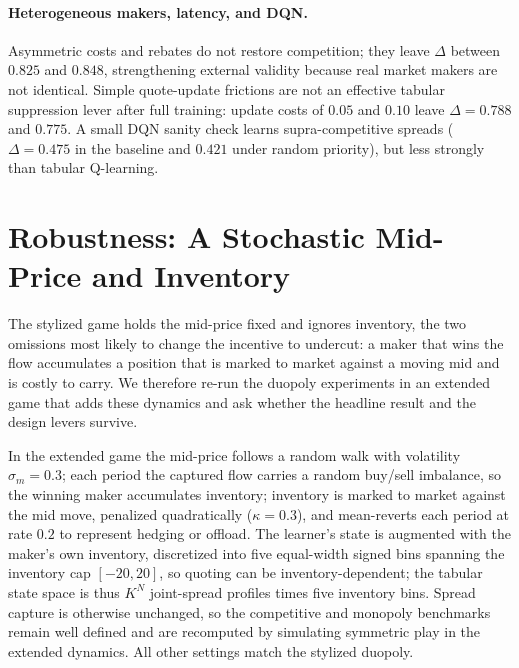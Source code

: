 \documentclass[sigconf]{acmart}
\begin{document}
\paragraph{Heterogeneous makers, latency, and DQN.} Asymmetric costs and rebates do not restore competition; they leave $\Delta$ between $0.825$ and $0.848$, strengthening external validity because real market makers are not identical. Simple quote-update frictions are not an effective tabular suppression lever after full training: update costs of $0.05$ and $0.10$ leave $\Delta=0.788$ and $0.775$. A small DQN sanity check learns supra-competitive spreads ($\Delta=0.475$ in the baseline and $0.421$ under random priority), but less strongly than tabular Q-learning.



\section{Robustness: A Stochastic Mid-Price and Inventory}
\label{sec:inventory}

The stylized game holds the mid-price fixed and ignores inventory, the two omissions most likely to change the incentive to undercut: a maker that wins the flow accumulates a position that is marked to market against a moving mid and is costly to carry. We therefore re-run the duopoly experiments in an extended game that adds these dynamics and ask whether the headline result and the design levers survive.

In the extended game the mid-price follows a random walk with volatility $\sigma_m = 0.3$; each period the captured flow carries a random buy/sell imbalance, so the winning maker accumulates inventory; inventory is marked to market against the mid move, penalized quadratically ($\kappa = 0.3$), and mean-reverts each period at rate $0.2$ to represent hedging or offload. The learner's state is augmented with the maker's own inventory, discretized into five equal-width signed bins spanning the inventory cap $[-20, 20]$, so quoting can be inventory-dependent; the tabular state space is thus $K^N$ joint-spread profiles times five inventory bins. Spread capture is otherwise unchanged, so the competitive and monopoly benchmarks remain well defined and are recomputed by simulating symmetric play in the extended dynamics. All other settings match the stylized duopoly.
\end{document}
